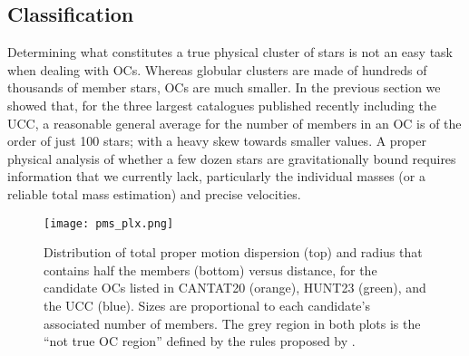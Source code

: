 \documentclass[fleqn,usenatbib]{mnras}
\begin{document}




\subsection{Classification}
\label{ssec:classif}

Determining what constitutes a true physical cluster of stars is not an easy
task when dealing with OCs. Whereas globular clusters are made of hundreds of
thousands of member stars, OCs are much smaller. In the previous section we
showed that, for the three largest catalogues published recently including
the UCC, a reasonable general average for the number of members in an
OC is of the order of just 100 stars; with a heavy skew towards smaller values.
A proper physical analysis of whether a few dozen stars are gravitationally
bound requires information that we currently lack, particularly the individual
masses (or a reliable total mass estimation) and precise velocities.

\begin{figure*}
	\texttt{[image: pms\_plx.png]}
    \caption{Distribution of total proper motion dispersion (top) and radius
    that contains half the members (bottom) versus distance, for the candidate
    OCs listed in CANTAT20 (orange), HUNT23 (green), and the UCC (blue).
    Sizes are proportional to each candidate's associated number of members.
    The grey region in both plots is the ``not true OC region'' defined by
    the rules proposed by \citet{Cantat-Anders_2020}.}
    \label{fig:pms_plx}
\end{figure*}
\end{document}
